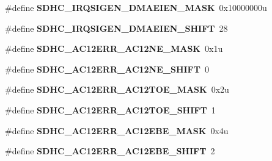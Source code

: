 \begin{DoxyCompactItemize}
\item 
\hypertarget{group___s_d_h_c___register___masks_gae22dd330ad7d3c84dc6906ad0303ccc5}{}\#define {\bfseries S\+D\+H\+C\+\_\+\+I\+R\+Q\+S\+I\+G\+E\+N\+\_\+\+D\+M\+A\+E\+I\+E\+N\+\_\+\+M\+A\+S\+K}~0x10000000u\label{group___s_d_h_c___register___masks_gae22dd330ad7d3c84dc6906ad0303ccc5}

\item 
\hypertarget{group___s_d_h_c___register___masks_gaceacd386a2b3cdab5975252cf61ad06c}{}\#define {\bfseries S\+D\+H\+C\+\_\+\+I\+R\+Q\+S\+I\+G\+E\+N\+\_\+\+D\+M\+A\+E\+I\+E\+N\+\_\+\+S\+H\+I\+F\+T}~28\label{group___s_d_h_c___register___masks_gaceacd386a2b3cdab5975252cf61ad06c}

\item 
\hypertarget{group___s_d_h_c___register___masks_ga41337efa0e8891905b61ceef4b4f20d4}{}\#define {\bfseries S\+D\+H\+C\+\_\+\+A\+C12\+E\+R\+R\+\_\+\+A\+C12\+N\+E\+\_\+\+M\+A\+S\+K}~0x1u\label{group___s_d_h_c___register___masks_ga41337efa0e8891905b61ceef4b4f20d4}

\item 
\hypertarget{group___s_d_h_c___register___masks_ga5f00efec00a18073d07677099619160d}{}\#define {\bfseries S\+D\+H\+C\+\_\+\+A\+C12\+E\+R\+R\+\_\+\+A\+C12\+N\+E\+\_\+\+S\+H\+I\+F\+T}~0\label{group___s_d_h_c___register___masks_ga5f00efec00a18073d07677099619160d}

\item 
\hypertarget{group___s_d_h_c___register___masks_ga8e4439265574a0caa1a8bfa16f98d304}{}\#define {\bfseries S\+D\+H\+C\+\_\+\+A\+C12\+E\+R\+R\+\_\+\+A\+C12\+T\+O\+E\+\_\+\+M\+A\+S\+K}~0x2u\label{group___s_d_h_c___register___masks_ga8e4439265574a0caa1a8bfa16f98d304}

\item 
\hypertarget{group___s_d_h_c___register___masks_ga9b67902a6fac916d2c9425c8262aebc5}{}\#define {\bfseries S\+D\+H\+C\+\_\+\+A\+C12\+E\+R\+R\+\_\+\+A\+C12\+T\+O\+E\+\_\+\+S\+H\+I\+F\+T}~1\label{group___s_d_h_c___register___masks_ga9b67902a6fac916d2c9425c8262aebc5}

\item 
\hypertarget{group___s_d_h_c___register___masks_ga20a7d6558b259a61499a0745f6450798}{}\#define {\bfseries S\+D\+H\+C\+\_\+\+A\+C12\+E\+R\+R\+\_\+\+A\+C12\+E\+B\+E\+\_\+\+M\+A\+S\+K}~0x4u\label{group___s_d_h_c___register___masks_ga20a7d6558b259a61499a0745f6450798}

\item 
\hypertarget{group___s_d_h_c___register___masks_gaa4872fca1b2f1ae350fcb6297e995469}{}\#define {\bfseries S\+D\+H\+C\+\_\+\+A\+C12\+E\+R\+R\+\_\+\+A\+C12\+E\+B\+E\+\_\+\+S\+H\+I\+F\+T}~2\label{group___s_d_h_c___register___masks_gaa4872fca1b2f1ae350fcb6297e995469}


\end{DoxyCompactItemize}
